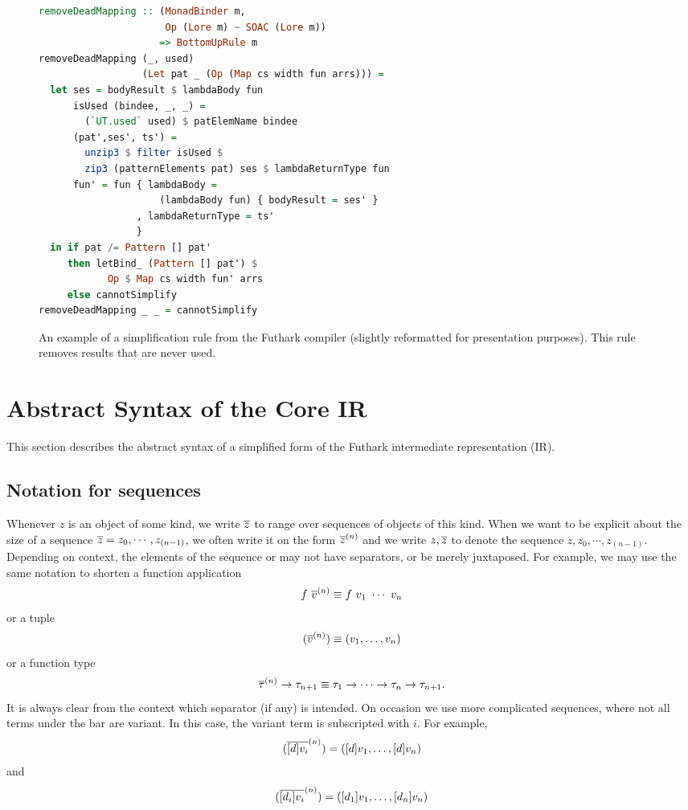 \begin{figure}
\begin{lstlisting}[basicstyle=\small\ttfamily,language=Haskell]
removeDeadMapping :: (MonadBinder m,
                      Op (Lore m) ~ SOAC (Lore m))
                     => BottomUpRule m
removeDeadMapping (_, used)
                  (Let pat _ (Op (Map cs width fun arrs))) =
  let ses = bodyResult $ lambdaBody fun
      isUsed (bindee, _, _) =
        (`UT.used` used) $ patElemName bindee
      (pat',ses', ts') =
        unzip3 $ filter isUsed $
        zip3 (patternElements pat) ses $ lambdaReturnType fun
      fun' = fun { lambdaBody =
                     (lambdaBody fun) { bodyResult = ses' }
                 , lambdaReturnType = ts'
                 }
  in if pat /= Pattern [] pat'
     then letBind_ (Pattern [] pat') $
            Op $ Map cs width fun' arrs
     else cannotSimplify
removeDeadMapping _ _ = cannotSimplify
\end{lstlisting}
  \caption{An example of a simplification rule from the Futhark
    compiler (slightly reformatted for presentation purposes).  This
    rule removes  results that are never used.}
  \label{fig:removeDeadMapping}
\end{figure}

\section{Abstract Syntax of the Core IR}
\label{sec:futhark-core-ast}

This section describes the abstract syntax of a simplified form of the
Futhark intermediate representation (IR).

\subsection{Notation for sequences}

Whenever $z$ is an object of some kind, we write $\overline{z}$ to range
over sequences of objects of this kind. When we want to be explicit
about the size of a sequence $\overline{z} = z_0,\cdots,z_{(n-1)}$, we
often write it on the form $\overline{z}^{(n)}$ and we write $z,\overline{z}$ to
denote the sequence $z,z_0,\cdots,z_{(n-1)}$.  Depending on context,
the elements of the sequence or may not have separators, or be merely
juxtaposed.  For example, we may use the same notation to shorten a
function application
\[
  f~\overline{v}^{(n)} \equiv f~v_{1}~\cdots~v_{n}
\]
or a tuple
\[
  (\overline{v}^{(n)}) \equiv (v_{1}, \ldots, v_{n})
\]
or a function type
\[
  \overline{\tau}^{(n)} \rightarrow \tau_{n+1} \equiv \tau_{1} \rightarrow \cdots \rightarrow \tau_{n} \rightarrow \tau_{n+1}.
\]
It is always clear from the context which separator (if any) is
intended.  On occasion we use more complicated sequences, where not
all terms under the bar are variant.  In this case, the variant term
is subscripted with $i$.  For example,
\[
  (\overline{[d]v_{i}}^{(n)}) = ([d]v_{1}, \ldots, [d] v_{n})
\]
and
\[
  (\overline{[d_{i}]v_{i}}^{(n)}) = ([d_{1}]v_{1}, \ldots, [d_{n}] v_{n})
\]

